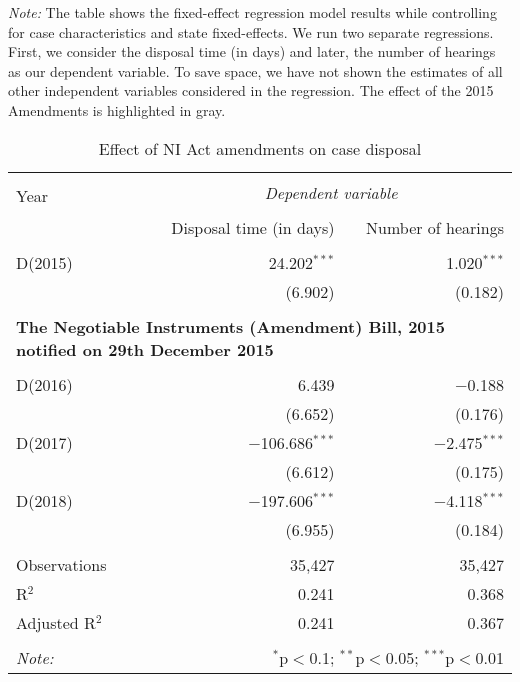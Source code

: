 \documentclass[12pt,a4paper]{article}
\begin{document}
	\begin{table}[h]
		\centering
		\caption{Effect of NI Act amendments on case
			disposal}\label{tab:amendments_effect}
		\footnotesize
		\textit{Note:} The table shows the fixed-effect regression model results while controlling for case characteristics and state fixed-effects. We run two separate regressions. First, we consider the disposal time (in days) and later, the number of hearings as our dependent variable. To save space, we have not shown the estimates of all other independent variables considered in the regression. The effect of the 2015 Amendments is highlighted in gray. 
		
		\begin{tabular}{@{\extracolsep{5pt}}lrr}
			\\[-1.8ex] 
			\hline \\[-1.8ex] 
			\multirow{2}{*}{Year} & \multicolumn{2}{c}{\textit{Dependent variable}} \\ 
			\cline{2-3} 
			\\[-1.8ex] & Disposal time (in days) & Number of hearings \\ 
			\hline \\[-1.8ex] 
			D(2015) & 24.202$^{***}$ & 1.020$^{***}$ \\ 
			& (6.902) & (0.182) \\ 
			& & \\
			\multicolumn{3}{l}{\textbf{The Negotiable Instruments (Amendment) Bill, 2015 notified on 29th December 2015}}\\
			& & \\ 
			D(2016) & 6.439 & $-$0.188 \\ 
			& (6.652) & (0.176) \\ 
			\rowcolor{lightgray}
			D(2017) & $-$106.686$^{***}$ & $-$2.475$^{***}$ \\ 
			& (6.612) & (0.175) \\ 
			\rowcolor{lightgray}
			D(2018) & $-$197.606$^{***}$ & $-$4.118$^{***}$ \\ 
			& (6.955) & (0.184) \\
			\hline \\[-1.8ex] 
			Observations & 35,427 & 35,427 \\ 
			R$^{2}$ & 0.241 & 0.368 \\ 
			Adjusted R$^{2}$ & 0.241 & 0.367 \\ 
			\hline \\[-1.8ex] 
			\textit{Note:} & \multicolumn{2}{r}{$^{*}$p$<$0.1; $^{**}$p$<$0.05; $^{***}$p$<$0.01} \\ 
		\end{tabular} 
	\end{table}
	
\end{document}
